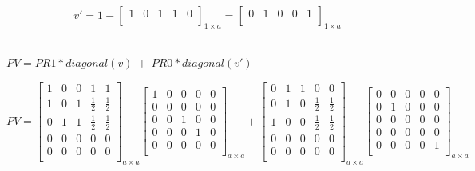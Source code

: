 $$v'=1-\left[
\begin{array}{ccccc}
1 & 0 & 1 & 1 & 0 \\
\end{array}
\right]_{1 \times a}
=
\left[
\begin{array}{ccccc}
0 & 1 & 0 & 0 & 1 \\
\end{array}
\right]_{1 \times a}
$$
\\

\begin{center}
$PV = PR1 * diagonal(v) \ + \ PR0 * diagonal(v')$
\end{center}

$$PV=
\left[
\begin{array}{ccccc}
1 & 0 & 0 & 1 & 1 \\
1 & 0 & 1 & \frac{1}{2} & \frac{1}{2} \\
0 & 1 & 1 & \frac{1}{2} & \frac{1}{2} \\
0 & 0 & 0 & 0 & 0 \\
0 & 0 & 0 & 0 & 0 \\
\end{array}
\right]_{a \times a}
\left[
\begin{array}{ccccc}
1 & 0 & 0 & 0 & 0 \\
0 & 0 & 0 & 0 & 0 \\
0 & 0 & 1 & 0 & 0 \\
0 & 0 & 0 & 1 & 0 \\
0 & 0 & 0 & 0 & 0 \\
\end{array}
\right]_{a \times a}
+
\left[
\begin{array}{ccccc}
0 & 1 & 1 & 0 & 0 \\
0 & 1 & 0 & \frac{1}{2} & \frac{1}{2} \\
1 & 0 & 0 & \frac{1}{2} & \frac{1}{2} \\
0 & 0 & 0 & 0 & 0 \\
0 & 0 & 0 & 0 & 0 \\
\end{array}
\right]_{a \times a}
\left[
\begin{array}{ccccc}
0 & 0 & 0 & 0 & 0 \\
0 & 1 & 0 & 0 & 0 \\
0 & 0 & 0 & 0 & 0 \\
0 & 0 & 0 & 0 & 0 \\
0 & 0 & 0 & 0 & 1 \\
\end{array}
\right]_{a \times a}
$$

